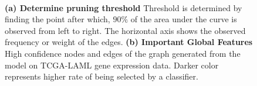 \begin{figure}[!htpb]
\setlength{\fboxsep}{0pt}%
\setlength{\fboxrule}{0.5pt}%
  \ \
  \caption{\textbf{(a) Determine pruning threshold} Threshold is determined by finding the point after which, $90\%$ of the area under the curve is observed from left to right. The horizontal axis shows the observed frequency or weight of the edges. \textbf{(b) Important Global Features} High confidence nodes and edges of the graph generated from the model on TCGA-LAML gene expression data. Darker color represents higher rate of being selected by a classifier.}
  \label{fig:summary-network}
\end{figure}

